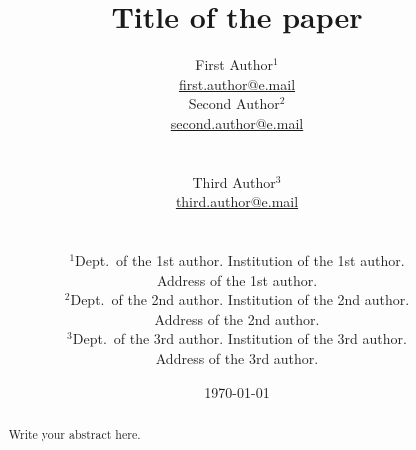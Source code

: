 \documentclass[10pt,twoside]{article}
\theoremstyle{remark}
\theoremstyle{definition}
\begin{document}
\title{Title of the paper}

\author{
\begin{minipage}[c]{0.3\linewidth}
\centering
First Author$^{1}$\\
\url{first.author@e.mail}
\end{minipage}
\begin{minipage}[c]{0.4\linewidth}
\centering
  Second Author$^{2}$\\
  \url{second.author@e.mail}
\end{minipage}\\ [0,3in]
\begin{minipage}[c]{0.4\linewidth}
\centering
  Third Author$^{3}$\\
  \url{third.author@e.mail}
\end{minipage}\\
\begin{minipage}[c]{0.9\linewidth}
\small
\centering
\vspace{\baselineskip}\noindent
$^{1}$Dept.~of the 1st author. Institution of the 1st author.\\
  Address of the 1st author.\\
\vspace{0.75\baselineskip}
$^{2}$Dept.~of the 2nd author. Institution of the 2nd author.\\
  Address of the 2nd author.\\
\vspace{0.75\baselineskip}
$^{3}$Dept.~of the 3rd author. Institution of the 3rd author.\\
  Address of the 3rd author.\\
\vspace{0.75\baselineskip}
\end{minipage}}

\date{\today}
\maketitle

\begin{abstract}
Write your abstract here.


\end{abstract}
\end{document}
